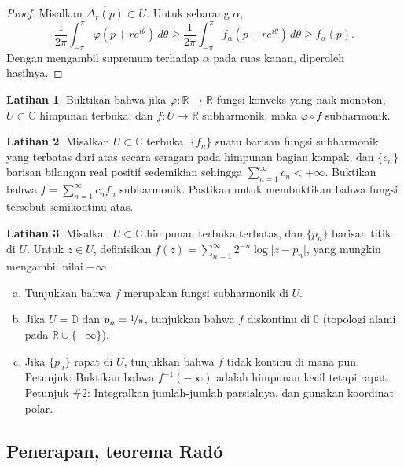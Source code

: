 \documentclass[12pt,openany]{book}
\newcommand{\sabs}[1]{\lvert {#1} \rvert}
\newcommand{\C}{{\mathbb{C}}}
\newcommand{\R}{{\mathbb{R}}}
\newcommand{\D}{{\mathbb{D}}}
\theoremstyle{plain}
\theoremstyle{remark}
\theoremstyle{definition}
\newenvironment{exbox}{%
    \def\FrameCommand{\vrule width 1pt \relax\hspace{10pt}}%
    \MakeFramed{\advance\hsize-\width\FrameRestore}%
}{%
    \endMakeFramed
}
\newenvironment{exparts}{%
    \leavevmode\begin{enumerate}[a),noitemsep,topsep=0pt,parsep=0pt,partopsep=0pt]
}{%
    \end{enumerate}
}
\theoremstyle{exercise}
\newtheorem{exercise}{Latihan}[section]
\theoremstyle{example}
\begin{document}
\begin{proof}
Misalkan $\overline{\Delta_r(p)} \subset U$.  Untuk sebarang $\alpha$,
\begin{equation*}
\frac{1}{2\pi} \int_{-\pi}^{\pi} \varphi (p+re^{i\theta})\, d\theta 
\geq
\frac{1}{2\pi} \int_{-\pi}^{\pi} f_\alpha (p+re^{i\theta})\, d\theta 
\geq f_\alpha(p) .
\end{equation*}
Dengan mengambil supremum terhadap $\alpha$ pada ruas kanan, diperoleh hasilnya.
\end{proof}

\begin{exbox}
\begin{exercise}
Buktikan bahwa jika $\varphi \colon \R \to \R$ fungsi konveks yang naik monoton,
$U \subset \C$ himpunan terbuka, dan $f \colon U \to \R$
subharmonik, maka $\varphi \circ f$ subharmonik.
\end{exercise}

\begin{exercise}
Misalkan $U \subset \C$ terbuka, $\{ f_n \}$ suatu barisan 
fungsi subharmonik yang terbatas dari atas secara seragam pada himpunan bagian kompak, dan 
$\{ c_n \}$ barisan bilangan real positif sedemikian sehingga
$\sum_{n=1}^\infty c_n < +\infty$.
Buktikan bahwa $f = \sum_{n=1}^\infty c_n f_n$ subharmonik.  Pastikan untuk membuktikan
bahwa fungsi tersebut semikontinu atas.
\end{exercise}

\begin{exercise}
Misalkan $U \subset \C$ himpunan terbuka terbatas, dan $\{ p_n \}$ barisan titik di
$U$. Untuk $z \in U$, definisikan
$f(z) = \sum_{n=1}^\infty 2^{-n} \log \sabs{z-p_n}$, yang mungkin mengambil
nilai $-\infty$.
\begin{exparts}
\item
Tunjukkan bahwa $f$ merupakan fungsi subharmonik di $U$.
\item
Jika $U = \D$ dan $p_n = \nicefrac{1}{n}$, tunjukkan bahwa $f$ diskontinu di $0$
(topologi alami pada $\R \cup \{ -\infty \}$).
\item
Jika $\{ p_n \}$ rapat di $U$, tunjukkan bahwa $f$ 
tidak kontinu di mana pun.
Petunjuk: Buktikan bahwa $f^{-1}(-\infty)$ adalah himpunan kecil tetapi rapat.
Petunjuk \#2: Integralkan jumlah-jumlah parsialnya, dan gunakan koordinat polar.
\end{exparts}
\end{exercise}
\end{exbox}

\subsection{Penerapan, teorema Rad\'o}
\end{document}
